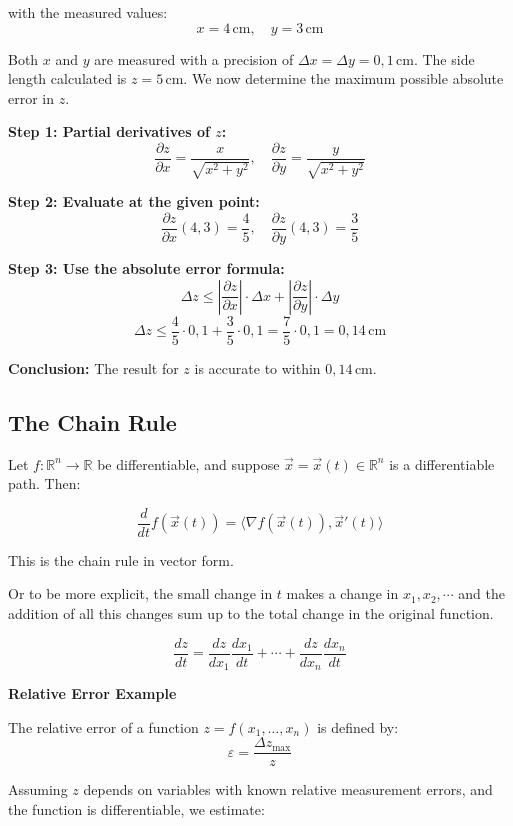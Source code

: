with the measured values:
\[
x = 4 \, \text{cm}, \quad y = 3 \, \text{cm}
\]

Both \( x \) and \( y \) are measured with a precision of \( \Delta x = \Delta y = 0{,}1 \, \text{cm} \). The side length calculated is \( z = 5 \, \text{cm} \). We now determine the maximum possible absolute error in \( z \).

\textbf{Step 1: Partial derivatives of \( z \):}
\[
\frac{\partial z}{\partial x} = \frac{x}{\sqrt{x^2 + y^2}}, \quad
\frac{\partial z}{\partial y} = \frac{y}{\sqrt{x^2 + y^2}}
\]

\textbf{Step 2: Evaluate at the given point:}
\[
\frac{\partial z}{\partial x}(4, 3) = \frac{4}{5}, \quad
\frac{\partial z}{\partial y}(4, 3) = \frac{3}{5}
\]

\textbf{Step 3: Use the absolute error formula:}
\[
\Delta z \leq \left| \frac{\partial z}{\partial x} \right| \cdot \Delta x + \left| \frac{\partial z}{\partial y} \right| \cdot \Delta y
\]
\[
\Delta z \leq \frac{4}{5} \cdot 0{,}1 + \frac{3}{5} \cdot 0{,}1 = \frac{7}{5} \cdot 0{,}1 = 0{,}14 \, \text{cm}
\]

\textbf{Conclusion:}  
The result for \( z \) is accurate to within \( \boxed{0{,}14 \, \text{cm}} \).


\subsection{The Chain Rule}

Let \( f : \mathbb{R}^n \to \mathbb{R} \) be differentiable, and suppose \( \vec{x} = \vec{x}(t) \in \mathbb{R}^n \) is a differentiable path. Then:

\[
\frac{d}{dt} f(\vec{x}(t)) = \langle \nabla f(\vec{x}(t)), \vec{x}'(t) \rangle
\]

This is the chain rule in vector form.

Or to be more explicit, the small change in \(t\) makes a change in \(x_1, x_2, \cdots\) and the addition of all this changes
sum up to the total change in the original function.

\[
\frac{dz}{dt} = \frac{dz}{dx_1}\frac{dx_1}{dt} + \cdots + \frac{dz}{dx_n}\frac{dx_n}{dt}
\]

\textbf{Relative Error Example}

The relative error of a function \( z = f(x_1, \dots, x_n) \) is defined by:
\[
\varepsilon = \frac{\Delta z_{\max}}{z}
\]

Assuming \( z \) depends on variables with known relative measurement errors, and the function is differentiable, we estimate:

